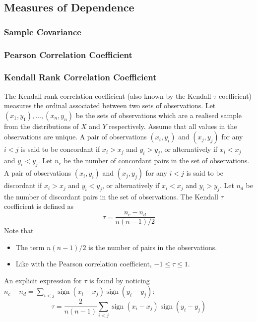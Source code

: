 \documentclass[11pt]{report} %
\begin{document}
\subsection{Measures of Dependence}

\subsubsection{Sample Covariance}

\subsubsection{Pearson Correlation Coefficient}

\subsubsection{Kendall Rank Correlation Coefficient}

The Kendall rank correlation coefficient (also known by the Kendall $\tau$ coefficient) measures the ordinal associated between two sets of observations. Let $\left(x_{1}, y_{1}\right), \dots, \left(x_{n}, y_{n}\right)$ be the sets of observations which are a realised sample from the distributions of $X$ and $Y$ respectively. Assume that all values in the observations are unique. A pair of observations $\left(x_{i}, y_{i}\right)$ and $\left(x_{j}, y_{j}\right)$ for any $i < j$ is said to be concordant if $x_{i} > x_{j}$ and $y_{i} > y_{j}$, or alternatively if $x_{i} < x_{j}$ and $y_{i} < y_{j}$. Let $n_{c}$ be the number of concordant pairs in the set of observations. A pair of observations $\left(x_{i}, y_{i}\right)$ and $\left(x_{j}, y_{j}\right)$ for any $i < j$ is said to be discordant if $x_{i} > x_{j}$ and $y_{i} < y_{j}$, or alternatively if $x_{i} < x_{j}$ and $y_{i} > y_{j}$. Let $n_{d}$ be the number of discordant pairs in the set of observations. The Kendall $\tau$ coefficient is defined as
\begin{equation}
\tau = \dfrac{n_{c} - n_{d}}{n\left(n - 1\right)/2}
\end{equation}
Note that
\begin{itemize}
\item The term $n\left(n - 1\right)/2$ is the number of pairs in the observations.
\item Like with the Pearson correlation coefficient, $-1 \leq \tau \leq 1$.
\end{itemize}
An explicit expression for $\tau$ is found by noticing $n_{c} - n_{d} = \sum_{i < j}\operatorname{sign}\left(x_{i} - x_{j}\right)\operatorname{sign}\left(y_{i} - y_{j}\right)$:
\begin{equation}
\tau = \dfrac{2}{n\left(n - 1\right)}\sum_{i < j}\operatorname{sign}\left(x_{i} - x_{j}\right)\operatorname{sign}\left(y_{i} - y_{j}\right)
\end{equation}
\end{document}
